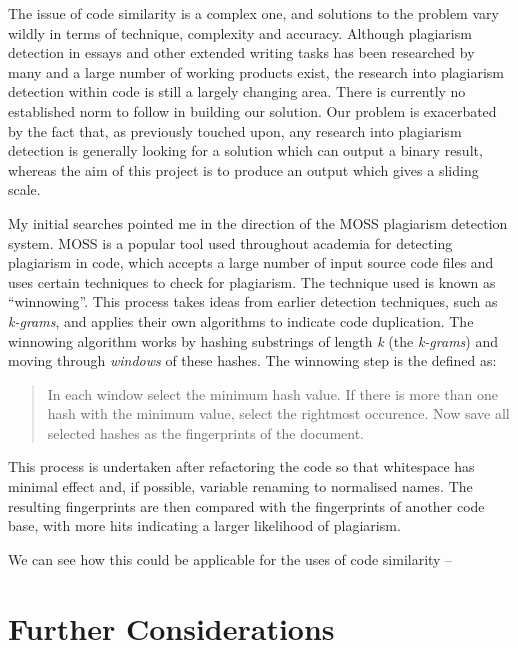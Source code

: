 The issue of code similarity is a complex one, and solutions to the problem
vary wildly in terms of technique, complexity and accuracy. Although plagiarism
detection in essays and other extended writing tasks has been 
researched by many and a large number of working products exist, the research
into plagiarism detection within code is still a largely changing area. There
is currently no established norm to follow in building our solution. Our problem
is exacerbated by the fact that, as previously touched upon,
any research into plagiarism detection is
generally looking for a solution which can output a binary result, whereas the
aim of this project is to produce an output which gives a sliding scale.

My initial searches pointed me in the direction of the MOSS plagiarism detection
system. MOSS is a popular tool used throughout academia for detecting plagiarism
in code, which accepts a large number of input source code files and uses certain
techniques to check for plagiarism. The technique used is known as 
``winnowing''\cite{winnowing}. This process takes ideas from earlier detection
techniques, such as \emph{k-grams}, and applies their own algorithms to indicate
code duplication. The winnowing algorithm works by hashing substrings of length
\emph{k} (the \emph{k-grams}) and moving through \emph{windows} of these hashes.
The winnowing step is the defined as: 
\begin{quote}In each window select the minimum hash value.
If there is more than one hash with the minimum value, select the rightmost
occurence. Now save all selected hashes as the fingerprints of the document.
\cite{winnowing}
\end{quote}

This process is undertaken after refactoring the code so that whitespace
has minimal effect and, if possible, variable renaming to normalised names.
The resulting fingerprints are then compared with the fingerprints of another
code base, with more hits indicating a larger likelihood of plagiarism.

We can see how this could be applicable for the uses of code similarity -- 




\section{Further Considerations}